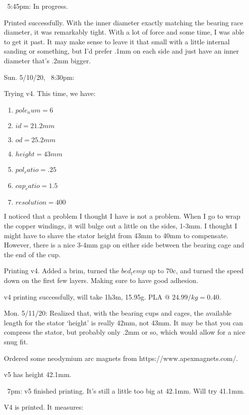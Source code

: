 \documentclass[11pt]{article} %
\begin{document}
~5:45pm: In progress.

Printed successfully. With the inner diameter exactly matching the bearing race diameter, it was remarkably tight. With a lot of force and some time, I was able to get it past. It may make sense to leave it that small with a little internal sanding or something, but I’d prefer .1mm on each side and just have an inner diameter that’s .2mm bigger.



Sun. 5/10/20, ~8:30pm:

Trying v4. This time, we have:

\begin{enumerate}
\item $pole_num=6$
\item $id=21.2mm$
\item $od=25.2mm$
\item $height=43mm$
\item $pol_ratio=.25$
\item $cap_ratio=1.5$
\item $resolution=400$
\end{enumerate}

I noticed that a problem I thought I have is not a problem. When I go to wrap the copper windings, it will bulge out a little on the sides, 1-3mm. I thought I might have to shave the stator height from 43mm to 40mm to compensate. However, there is a nice 3-4mm gap on either side between the bearing cage and the end of the cup.





Printing v4. Added a brim, turned the $bed_temp$ up to 70c, and turned the speed down on the first few layers. Making sure to have good adhesion.

v4 printing successfully, will take 1h3m, 15.95g. PLA @ $24.99/kg = $0.40.

Mon. 5/11/20: Realized that, with the bearing cups and cages, the available length for the stator ‘height’ is really 42mm, not 43mm. It may be that you can compress the stator, but probably only .2mm or so, which would allow for a nice snug fit.

Ordered some neodymium arc magnets from https://www.apexmagnets.com/.

v5 has height 42.1mm.

~7pm: v5 finished printing. It’s still a little too big at 42.1mm. Will try 41.1mm.




V4 is printed. It measures:
\end{document}
